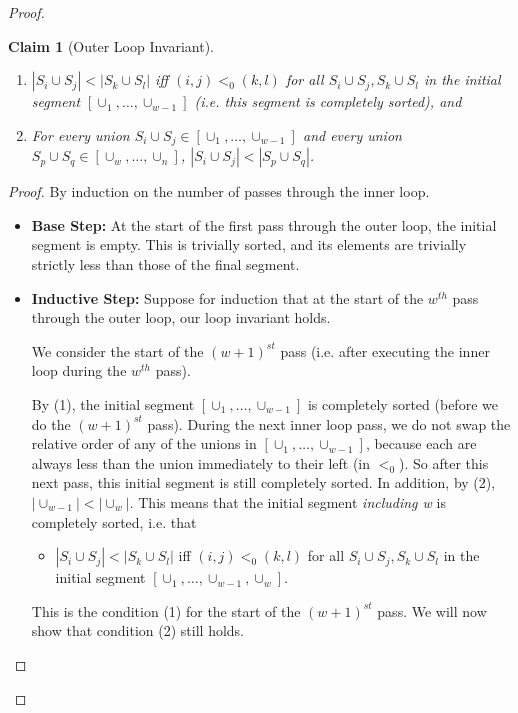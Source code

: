 \documentclass[12pt]{article}
\newtheorem{claim}{Claim}
\begin{document}
\begin{proof}
\begin{claim}[Outer Loop Invariant]
\begin{enumerate}
    \item $|S_i \cup S_j| < |S_k \cup S_l|$ iff $(i, j) <_0 (k, l)$ for all $S_i \cup S_j, S_k \cup S_l$ in the initial segment $[\cup_1, \ldots, \cup_{w-1}]$ (i.e. this segment is completely sorted), and
    
    \item For every union $S_i \cup S_j \in [\cup_1, \ldots, \cup_{w-1}]$ and every union $S_p \cup S_q \in [\cup_w, \ldots, \cup_n]$, $|S_i \cup S_j| < |S_p \cup S_q|$.
\end{enumerate}

\end{claim}

\begin{proof}
By induction on the number of passes through the inner loop.

\begin{itemize}
    \item 
\textbf{Base Step:}
At the start of the first pass through the outer loop, the initial segment is empty.  This is trivially sorted, and its elements are trivially strictly less than those of the final segment.

    \item
\textbf{Inductive Step:}
Suppose for induction that at the start of the $w^{th}$ pass through the outer loop, our loop invariant holds.

We consider the start of the $(w+1)^{st}$ pass (i.e. after executing the inner loop during the $w^{th}$ pass).

By (1), the initial segment $[\cup_1, \ldots, \cup_{w-1}]$ is completely sorted (before we do the $(w+1)^{st}$ pass).  During the next inner loop pass, we do not swap the relative order of any of the unions in $[\cup_1, \ldots, \cup_{w-1}]$, because each are always less than the union immediately to their left (in $<_0$).  So after this next pass, this initial segment is still completely sorted.  In addition, by (2), $|\cup_{w-1}| < |\cup_w|$.  This means that the initial segment \textit{including w} is completely sorted, i.e. that

\begin{itemize}
    \item $|S_i \cup S_j| < |S_k \cup S_l|$ iff $(i, j) <_0 (k, l)$ for all $S_i \cup S_j, S_k \cup S_l$ in the initial segment $[\cup_1, \ldots, \cup_{w-1}, \cup_w]$.
\end{itemize}

This is the condition (1) for the start of the $(w+1)^{st}$ pass.  We will now show that condition (2) still holds.


\end{itemize}
\end{proof}
\end{proof}
\end{document}
